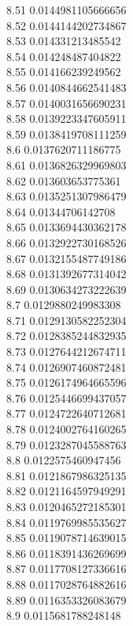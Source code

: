 {8.51	0.0144981105666656\\
8.52	0.0144144202734867\\
8.53	0.014331213485542\\
8.54	0.014248487404822\\
8.55	0.014166239249562\\
8.56	0.0140844662541483\\
8.57	0.0140031656690231\\
8.58	0.0139223347605911\\
8.59	0.0138419708111259\\
8.6	0.0137620711186775\\
8.61	0.0136826329969803\\
8.62	0.013603653775361\\
8.63	0.0135251307986479\\
8.64	0.01344706142708\\
8.65	0.0133694430362178\\
8.66	0.0132922730168526\\
8.67	0.0132155487749186\\
8.68	0.0131392677314042\\
8.69	0.0130634273222639\\
8.7	0.0129880249983308\\
8.71	0.0129130582252304\\
8.72	0.0128385244832935\\
8.73	0.0127644212674711\\
8.74	0.0126907460872481\\
8.75	0.0126174964665596\\
8.76	0.0125446699437057\\
8.77	0.0124722640712681\\
8.78	0.0124002764160265\\
8.79	0.0123287045588763\\
8.8	0.0122575460947456\\
8.81	0.0121867986325135\\
8.82	0.0121164597949291\\
8.83	0.0120465272185301\\
8.84	0.0119769985535627\\
8.85	0.0119078714639015\\
8.86	0.0118391436269699\\
8.87	0.0117708127336616\\
8.88	0.0117028764882616\\
8.89	0.0116353326083679\\
8.9	0.0115681788248148\\
}
